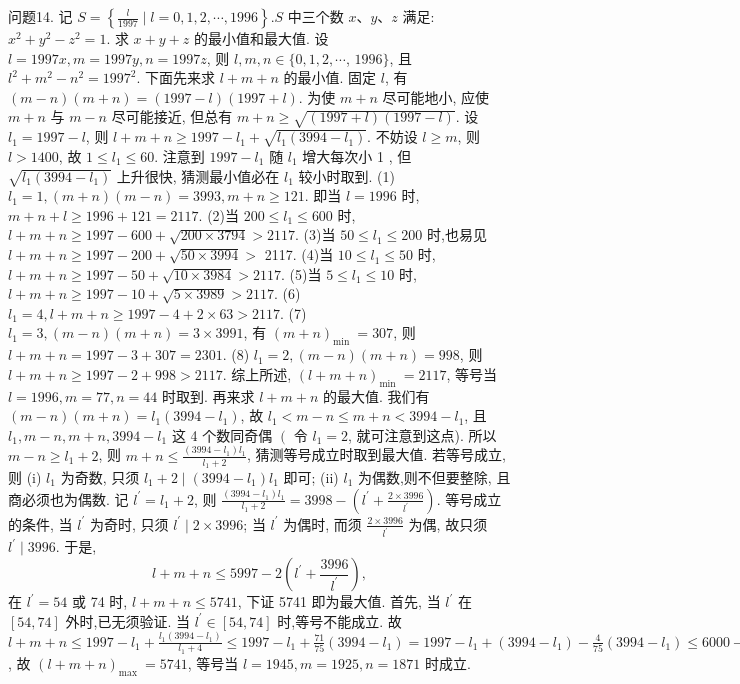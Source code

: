 问题14. 记 $S=\left\{\frac{l}{1997} \mid l=0,1,2, \cdots, 1996\right\} . S$ 中三个数 $x 、 y 、 z$ 满足: $x^2+ y^2-z^2=1$. 求 $x+y+z$ 的最小值和最大值.
设 $l=1997 x, m=1997 y, n=1997 z$, 则 $l, m, n \in\{0,1,2, \cdots$, $1996\}$, 且 $l^2+m^2-n^2=1997^2$.
下面先来求 $l+m+n$ 的最小值.
固定 $l$, 有 $(m-n)(m+n)=(1997-l)(1997+l)$. 为使 $m+n$ 尽可能地小, 应使 $m+n$ 与 $m-n$ 尽可能接近, 但总有 $m+n \geqslant \sqrt{(1997+l)(1997-l)}$. 设 $l_1=1997-l$, 则 $l+m+n \geqslant 1997-l_1+\sqrt{l_1\left(3994-l_1\right)}$.
不妨设 $l \geqslant m$, 则 $l>1400$, 故 $1 \leqslant l_1 \leqslant 60$.
注意到 $1997-l_1$ 随 $l_1$ 增大每次小 1 , 但 $\sqrt{l_1\left(3994-l_1\right)}$ 上升很快, 猜测最小值必在 $l_1$ 较小时取到.
(1) $l_1=1,(m+n)(m-n)=3993, m+n \geqslant 121$.
即当 $l=1996$ 时, $m+n+l \geqslant 1996+121=2117$.
(2)当 $200 \leqslant l_1 \leqslant 600$ 时, $l+m+n \geqslant 1997-600+\sqrt{200 \times 3794}>2117$.
(3)当 $50 \leqslant l_1 \leqslant 200$ 时,也易见 $l+m+n \geqslant 1997-200+\sqrt{50 \times 3994}>$ 2117.
(4)当 $10 \leqslant l_1 \leqslant 50$ 时, $l+m+n \geqslant 1997-50+\sqrt{10 \times 3984}>2117$.
(5)当 $5 \leqslant l_1 \leqslant 10$ 时, $l+m+n \geqslant 1997-10+\sqrt{5 \times 3989}>2117$.
(6) $l_1=4, l+m+n \geqslant 1997-4+2 \times 63>2117$.
(7) $l_1=3,(m-n)(m+n)=3 \times 3991$, 有 $(m+n)_{\text {min }}=307$, 则 $l+m+ n=1997-3+307=2301$.
(8) $l_1=2,(m-n)(m+n)=998$, 则 $l+m+n \geqslant 1997-2+998>2117$.
综上所述, $(l+m+n)_{\text {min }}=2117$, 等号当 $l=1996, m=77, n=44$ 时取到.
再来求 $l+m+n$ 的最大值.
我们有 $(m-n)(m+n)=l_1\left(3994-l_1\right)$, 故 $l_1<m-n \leqslant m+n<3994- l_1$, 且 $l_1, m-n, m+n, 3994-l_1$ 这 4 个数同奇偶 $\left(\right.$ 令 $l_1=2$, 就可注意到这点). 所以 $m-n \geqslant l_1+2$, 则 $m+n \leqslant \frac{\left(3994-l_1\right) l_1}{l_1+2}$, 猜测等号成立时取到最大值.
若等号成立, 则 (i) $l_1$ 为奇数, 只须 $l_1+2 \mid\left(3994-l_1\right) l_1$ 即可;
(ii) $l_1$ 为偶数,则不但要整除, 且商必须也为偶数.
记 $l^{\prime}=l_1+2$, 则 $\frac{\left(3994-l_1\right) l_1}{l_1+2}=3998-\left(l^{\prime}+\frac{2 \times 3996}{l^{\prime}}\right)$.
等号成立的条件, 当 $l^{\prime}$ 为奇时, 只须 $l^{\prime} \mid 2 \times 3996$; 当 $l^{\prime}$ 为偶时, 而须
$\frac{2 \times 3996}{l^{\prime}}$ 为偶, 故只须 $l^{\prime} \mid 3996$.
于是,
$$
l+m+n \leqslant 5997-2\left(l^{\prime}+\frac{3996}{l^{\prime}}\right),
$$
在 $l^{\prime}=54$ 或 74 时, $l+m+n \leqslant 5741$, 下证 5741 即为最大值.
首先, 当 $l^{\prime}$ 在 $[54,74]$ 外时,已无须验证.
当 $l^{\prime} \in[54,74]$ 时,等号不能成立.
故 $l+m+n \leqslant 1997-l_1+\frac{l_1\left(3994-l_1\right)}{l_1+4} \leqslant 1997-l_1+\frac{71}{75}\left(3994-l_1\right)= 1997-l_1+\left(3994-l_1\right)-\frac{4}{75}\left(3994-l_1\right) \leqslant 6000-100-\frac{4}{75} \times 3750<574.1$, 故 $(l+m+n)_{\text {max }}=5741$, 等号当 $l=1945, m=1925, n=1871$ 时成立.



